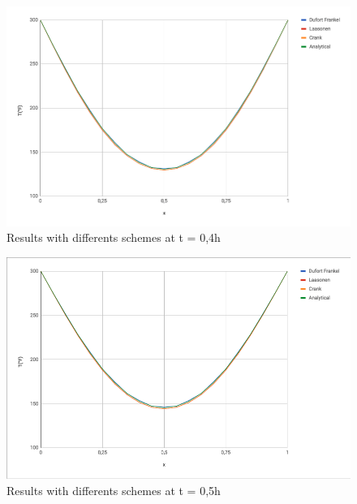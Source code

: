 \documentclass{article}
\begin{document}
                \begin{figure}[H]
                    \includegraphics[width=\textwidth]{t04.png}
                    \caption{Results with differents schemes at t = 0,4h}
                \end{figure}
                \begin{figure}[H]
                    \includegraphics[width=\textwidth]{t05.png}
                    \caption{Results with differents schemes at t = 0,5h}
                \end{figure}
\end{document}

